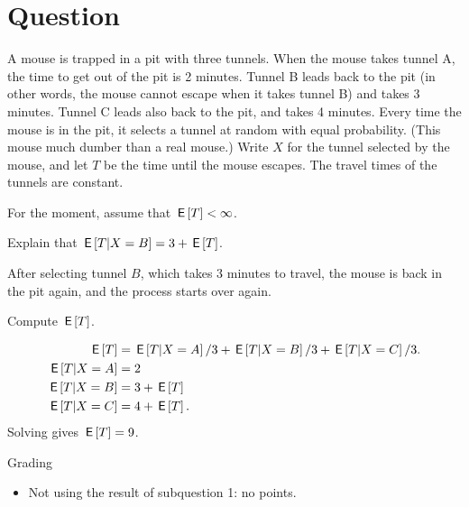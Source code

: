 \section{Question}

A mouse is trapped in a pit with three tunnels.
When the mouse takes tunnel A, the time to get out of the pit is 2 minutes.
Tunnel B leads back to the pit (in other words, the mouse cannot escape when it takes tunnel B) and takes 3 minutes.
Tunnel C leads also back to the pit, and takes 4 minutes.
Every time the mouse is in the pit, it selects a tunnel at random with equal probability.
(This mouse much dumber than a real mouse.)
Write $X$ for the tunnel selected by the mouse, and let $T$ be the time until the mouse escapes.
The travel times of the tunnels are constant.

For the moment, assume that $\,\mathsf{E}\left[T\right] < \infty$.


\begin{exercise}[1]
  Explain that $\,\mathsf{E}\left[T|X=B\right] = 3 + \,\mathsf{E}\left[T\right]$.
\begin{solution}
After selecting tunnel $B$, which takes 3 minutes to travel, the mouse is back in the pit again, and the process starts over again.
\end{solution}
\end{exercise}


\begin{exercise}[1]
  Compute $\,\mathsf{E}\left[T\right]$.
\begin{solution}
    \begin{align}
\,\mathsf{E}\left[T\right] &= \,\mathsf{E}\left[T|X=A\right]/3 + \,\mathsf{E}\left[T|X=B\right]/3 + \,\mathsf{E}\left[T|X=C\right]/3.\\
\,\mathsf{E}\left[T|X=A\right] &= 2\\
\,\mathsf{E}\left[T|X=B\right] &= 3 + \,\mathsf{E}\left[T\right]\\
\,\mathsf{E}\left[T|X=C\right] &= 4 + \,\mathsf{E}\left[T\right].
    \end{align}
Solving gives $\,\mathsf{E}\left[T\right]=9$.

Grading
\begin{itemize}
\item Not using the result of subquestion 1: no points.
\end{itemize}
\end{solution}
\end{exercise}


